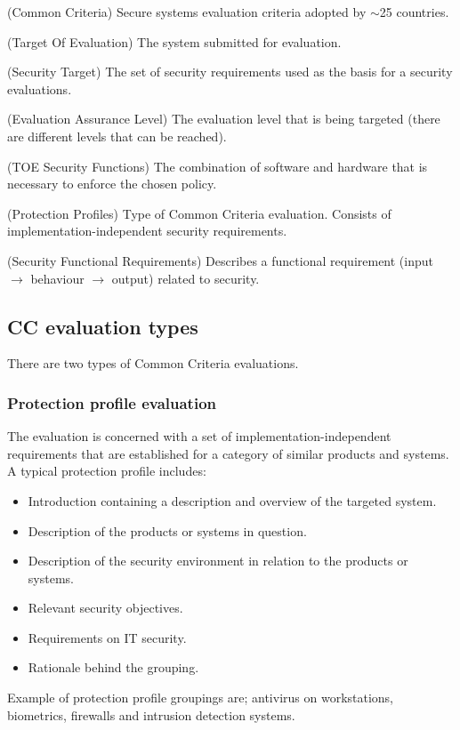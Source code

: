 \documentclass[10pt]{article}
\begin{document}
    \begin{description}[style=multiline,leftmargin=1.7cm]
      \item[CC]{
          (Common Criteria) Secure systems evaluation criteria adopted by
          $\sim$25 countries.
      }
      \item[TOE]{
          (Target Of Evaluation) The system submitted for evaluation.
      }
      \item[ST]{
          (Security Target) The set of security requirements used as the basis
          for a security evaluations.
      }
      \item[EAL]{
          (Evaluation Assurance Level) The evaluation level that is being
          targeted (there are different levels that can be reached).
      }
      \item[TSF]{
          (TOE Security Functions) The combination of software and hardware
          that is necessary to enforce the chosen policy.
      }
      \item[PP]{
          (Protection Profiles) Type of Common Criteria evaluation. Consists of
          implementation-independent security requirements.
      }
      \item[SFR]{
          (Security Functional Requirements) Describes a functional requirement
          (input $\rightarrow$ behaviour $\rightarrow$ output) related to
          security.
      }
    \end{description}

    \subsection{CC evaluation types}

      There are two types of Common Criteria evaluations.

      \subsubsection{Protection profile evaluation}

        The evaluation is concerned with a set of implementation-independent
        requirements that are established for a category of similar products
        and systems. A typical protection profile includes:
        \begin{itemize}
          \item{Introduction containing a description and overview of the
            targeted system.}
          \item{Description of the products or systems in question.}
          \item{Description of the security environment in relation to the
            products or systems.}
          \item{Relevant security objectives.}
          \item{Requirements on IT security.}
          \item{Rationale behind the grouping.}
        \end{itemize}
        Example of protection profile groupings are; antivirus on workstations,
        biometrics, firewalls and intrusion detection systems.
\end{document}

